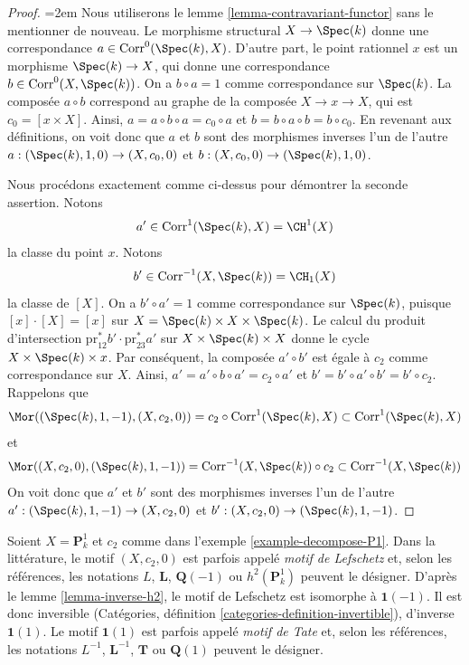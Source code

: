 \begin{proof}
{\emergencystretch=2em Nous utiliserons le lemme \ref{lemma-contravariant-functor} sans le mentionner de nouveau.
Le morphisme structural $X \to \Spec(k)$ donne une correspondance
$a \in \text{Corr}^0(\Spec(k), X)$. D'autre part, le point rationnel
$x$ est un morphisme $\Spec(k) \to X$, qui donne une correspondance
$b \in \text{Corr}^0(X, \Spec(k))$. On a $b \circ a = 1$ comme
correspondance sur $\Spec(k)$. La composée $a \circ b$ correspond
au graphe de la composée $X \to x \to X$, qui est
$c_0 = [x \times X]$. Ainsi, $a = a \circ b \circ a = c_0 \circ a$
et $b = b \circ a \circ b = b \circ c_0$.
En revenant aux définitions, on voit donc que
$a$ et $b$ sont des morphismes inverses l'un de l'autre
$a : (\Spec(k), 1, 0) \to (X, c_0, 0)$ et
$b : (X, c_0, 0) \to (\Spec(k), 1, 0)$.\par}

\medskip\noindent
Nous procédons exactement comme ci-dessus pour démontrer la seconde assertion.
Notons
$$
a' \in \text{Corr}^1(\Spec(k), X) = \CH^1(X)
$$
la classe du point $x$. Notons
$$
b' \in \text{Corr}^{-1}(X, \Spec(k)) = \CH_1(X)
$$
la classe de $[X]$. On a $b' \circ a' = 1$ comme correspondance
sur $\Spec(k)$, puisque $[x] \cdot [X] = [x]$ sur
$X = \Spec(k) \times X \times \Spec(k)$. Le calcul du
produit d'intersection $\text{pr}_{12}^*b' \cdot \text{pr}_{23}^*a'$
sur $X \times \Spec(k) \times X$ donne le cycle
$X \times \Spec(k) \times x$. Par conséquent,
la composée $a' \circ b'$ est égale à $c_2$ comme
correspondance sur $X$. Ainsi, $a' = a' \circ b \circ a' = c_2 \circ a'$
et $b' = b' \circ a' \circ b' = b' \circ c_2$. Rappelons que
$$
\Mor((\Spec(k), 1, -1), (X, c_2, 0)) =
c_2 \circ \text{Corr}^1(\Spec(k), X)
\subset
\text{Corr}^1(\Spec(k), X)
$$
et
$$
\Mor((X, c_2, 0), (\Spec(k), 1, -1)) =
\text{Corr}^{-1}(X, \Spec(k)) \circ c_2
\subset
\text{Corr}^{-1}(X, \Spec(k))
$$
On voit donc que $a'$ et $b'$ sont des morphismes inverses l'un de l'autre
$a' : (\Spec(k), 1, -1) \to (X, c_2, 0)$ et
$b' : (X, c_2, 0) \to (\Spec(k), 1, -1)$.
\end{proof}

\begin{remark}
\label{remark-lefschetz-tate}
Soient $X = \mathbf{P}^1_k$ et $c_2$ comme dans l'exemple \ref{example-decompose-P1}.
Dans la littérature, le motif $(X, c_2, 0)$ est parfois appelé
{\it motif de Lefschetz} et, selon les références, les notations
$L$, $\mathbf{L}$, $\mathbf{Q}(-1)$ ou $h^2(\mathbf{P}^1_k)$
peuvent le désigner. D'après le lemme \ref{lemma-inverse-h2}, le motif de Lefschetz
est isomorphe à $\mathbf{1}(-1)$. Il est donc
inversible (Catégories, définition \ref{categories-definition-invertible}),
d'inverse
$\mathbf{1}(1)$. Le motif $\mathbf{1}(1)$ est parfois appelé
{\it motif de Tate} et, selon les références, les notations
$L^{-1}$, $\mathbf{L}^{-1}$, $\mathbf{T}$ ou $\mathbf{Q}(1)$
peuvent le désigner.
\end{remark}

